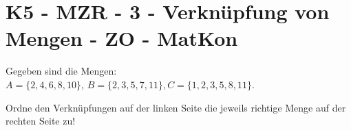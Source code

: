 \section{K5 - MZR - 3 - Verknüpfung von Mengen - ZO - MatKon}

\begin{beispiel}[K5 - MZR]{1}
Gegeben sind die Mengen:\\ 
$A=\{2, 4, 6, 8, 10\}$, $B=\{2, 3, 5, 7, 11\}, C=\{1, 2, 3, 5, 8, 11\}$.

Ordne den Verknüpfungen auf der linken Seite die jeweils richtige Menge auf der rechten Seite zu!

\end{beispiel}